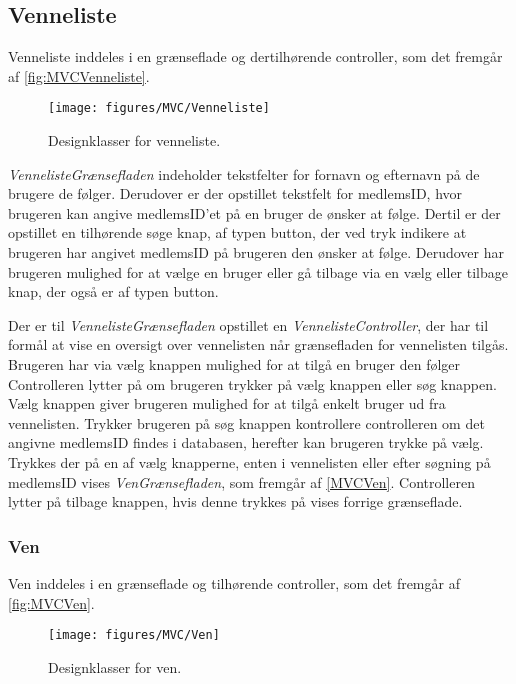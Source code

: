 \subsection{Venneliste}
Venneliste inddeles i en grænseflade og dertilhørende controller, som det fremgår af \autoref{fig:MVCVenneliste}. 

\begin{figure} [H]
\centering
\texttt{[image: figures/MVC/Venneliste]}
\caption{Designklasser for venneliste.}
\label{fig:MVCVenneliste}
\end{figure}

\noindent
\textit{VennelisteGrænsefladen} indeholder tekstfelter for fornavn og efternavn på de brugere de følger. Derudover er der opstillet tekstfelt for medlemsID, hvor brugeren kan angive medlemsID'et på en bruger de ønsker at følge. Dertil er der opstillet en tilhørende søge knap, af typen button, der ved tryk indikere at brugeren har angivet medlemsID på brugeren den ønsker at følge. Derudover har brugeren mulighed for at vælge en bruger eller gå tilbage via en vælg eller tilbage  knap, der også er af typen button. 


Der er til \textit{VennelisteGrænsefladen} opstillet en \textit{VennelisteController}, der har til formål at vise en oversigt over vennelisten når grænsefladen for vennelisten tilgås. Brugeren har via vælg knappen mulighed for at tilgå en bruger den følger
Controlleren lytter på om brugeren trykker på vælg knappen eller søg knappen. Vælg knappen giver brugeren mulighed for at tilgå enkelt bruger ud fra vennelisten. Trykker brugeren på søg knappen kontrollere controlleren om det angivne medlemsID findes i databasen, herefter kan brugeren trykke på vælg. Trykkes der på en af vælg knapperne, enten i vennelisten eller efter søgning på medlemsID vises \textit{VenGrænsefladen}, som fremgår af \autoref{MVCVen}. Controlleren lytter på tilbage knappen, hvis denne trykkes på vises forrige grænseflade. 


\subsubsection{Ven}
Ven inddeles i en grænseflade og tilhørende controller, som det fremgår af \autoref{fig:MVCVen}.

\begin{figure} [H]
\centering
\texttt{[image: figures/MVC/Ven]}
\caption{Designklasser for ven.}
\label{fig:MVCVen}
\end{figure}

